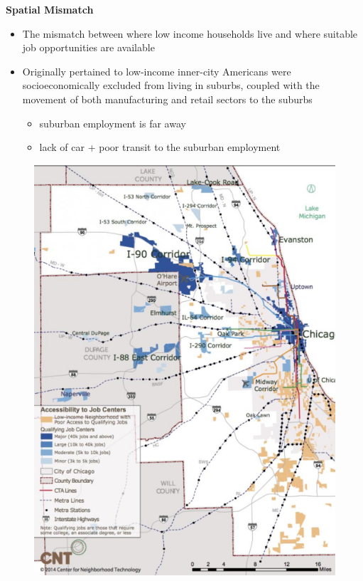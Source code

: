 \documentclass[aspectratio=169]{beamer}
\begin{document}
\begin{frame}
	
	\textbf{Spatial Mismatch}
	
	\begin{itemize}
		\item The mismatch between where low income households live and
		where suitable job opportunities are available
		
		\item Originally pertained to low-income inner-city Americans
		were socioeconomically excluded from living in suburbs,
		coupled with the movement of both manufacturing and retail
		sectors to the suburbs
		
		
		\begin{itemize}
			\item suburban employment is far away
			\item lack of car + poor transit to the suburban employment
		\end{itemize}
	\end{itemize}
	
\end{frame}




\begin{frame}
	
	\begin{figure}
		\centering
		\includegraphics[width=0.48\linewidth]{images/chicago_spatial_mismatch.png}
	\end{figure}
	
\end{frame}
\end{document}
